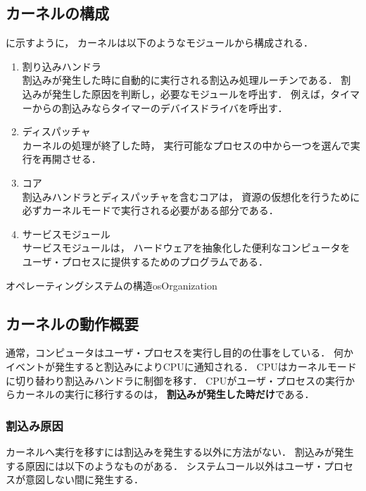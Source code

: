 \subsection{カーネルの構成}
に示すように，
カーネルは以下のようなモジュールから構成される．

\begin{enumerate}
\item 割り込みハンドラ \\
割込みが発生した時に自動的に実行される割込み処理ルーチンである．
割込みが発生した原因を判断し，必要なモジュールを呼出す．
例えば，タイマーからの割込みならタイマーのデバイスドライバを呼出す．

\item ディスパッチャ \\
カーネルの処理が終了した時，
実行可能なプロセスの中から一つを選んで実行を再開させる．

\item コア \\
割込みハンドラとディスパッチャを含むコアは，
資源の仮想化を行うために必ずカーネルモードで実行される必要がある部分である．

\item サービスモジュール \\
サービスモジュールは，
ハードウェアを抽象化した便利なコンピュータを
ユーザ・プロセスに提供するためのプログラムである．
\end{enumerate}

{オペレーティングシステムの構造}{osOrganization}

\subsection{カーネルの動作概要}
通常，コンピュータはユーザ・プロセスを実行し目的の仕事をしている．
何かイベントが発生すると割込みによりCPUに通知される．
CPUはカーネルモードに切り替わり割込みハンドラに制御を移す．
CPUがユーザ・プロセスの実行からカーネルの実行に移行するのは，
{\bf 割込みが発生した時だけ}である．

\subsubsection{割込み原因}
カーネルへ実行を移すには割込みを発生する以外に方法がない．
割込みが発生する原因には以下のようなものがある．
システムコール以外はユーザ・プロセスが意図しない間に発生する．

